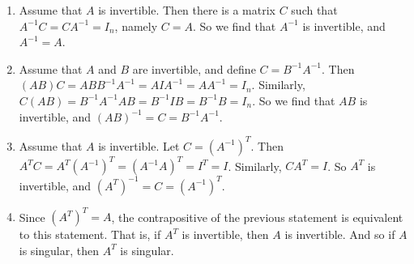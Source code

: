 \begin{enumerate}
    \item Assume that $A$ is invertible. Then there is a matrix $C$ such that $A^{-1}C = C A^{-1} = I_n$, namely $C=A$. So we find that $A^{-1}$ is invertible, and $A^{-1} = A$.
    \item Assume that $A$ and $B$ are invertible, and define $C = B^{-1} A^{-1}$. Then $(AB)C = ABB^{-1}A^{-1} = A I A^{-1} = A A^{-1} = I_n$. Similarly, $C(AB) = B^{-1} A^{-1} AB = B^{-1} I B = B^{-1} B = I_n$. So we find that $AB$ is invertible, and $(AB)^{-1} = C = B^{-1} A^{-1}$.
    \item Assume that $A$ is invertible. Let $C = (A^{-1})^T$. Then $A^T C = A^T (A^{-1})^T = (A^{-1} A)^T = I^T = I$. Similarly, $C A^T = I$. So $A^T$ is invertible, and $(A^T)^{-1} = C = (A^{-1})^T$.
    \item Since $(A^T)^T = A$, the contrapositive of the previous statement is equivalent to this statement. That is, if $A^T$ is invertible, then $A$ is invertible. And so if $A$ is singular, then $A^T$ is singular.
\end{enumerate}

